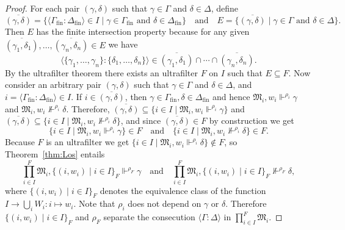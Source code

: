 \documentclass[submission,copyright,creativecommons]{eptcs}
\newcommand{\mo}{\mathfrak}
\newcommand{\finset}{_\mathrm{fin}}
\newcommand{\consec}[2]{\langle #1:#2 \rangle}
\newcommand{\satisfySym}{\Vdash}
\newcommand{\satisfy}[4]{#1, #2 \satisfySym^{#4} #3}
\newcommand{\notsatisfy}[4]{#1, #2 \not\Vdash^{#4} #3}
\begin{document}
\begin{proof}
  For each pair $(\gamma,\delta)$ such that
  $\gamma \in \Gamma$ and $\delta \in \Delta$,
  define 
  \begin{equation*}
    \overline{(\gamma,\delta)} = \{ \consec{\Gamma\finset}{\Delta\finset} \in I \mid \gamma \in \Gamma\finset \text{ and } \delta \in \Delta\finset \}
  \quad\text{and}\quad
    E = \{\overline{(\gamma,\delta)} \mid \gamma \in \Gamma \text{ and } \delta \in \Delta \}.
  \end{equation*}
  Then $E$ has the finite intersection property because for any given $\overline{(\gamma_1,\delta_1)},\ldots, \overline{(\gamma_n,\delta_n)} \in E$ we have
  \begin{equation*}
    \consec{ \{\gamma_1,\ldots,\gamma_n\}}{\{\delta_1,\ldots,\delta_n\} }  \in {\overline{(\gamma_1,\delta_1)}}\cap\cdots\cap {\overline{(\gamma_n,\delta_n)}}.
  \end{equation*}
  By the ultrafilter theorem \cite[Theorem~4.1.3]{ChaKei73} there exists an 
  ultrafilter $F$ on $I$ such that $E \subseteq F$.
%
  Now consider an arbitrary pair $(\gamma, \delta)$ such that
  $\gamma \in \Gamma$ and $\delta \in \Delta$, and $i= \consec{\Gamma\finset}{\Delta\finset} \in I$. 
  If $i \in \overline{(\gamma,\delta)}$, then $\gamma \in \Gamma\finset, \delta \in \Delta\finset$
  and hence $\satisfy{\mo{M}_i}{w_i}{\gamma}{\rho_i}$ and $\notsatisfy{\mo{M}_i}{w_i}{\delta}{\rho_i}$. Therefore,
  $\overline{(\gamma,\delta)} \subseteq \{ i \in I \mid \satisfy{\mo{M}_i}{w_i}{\gamma}{\rho_i}\}$
  and $\overline{(\gamma,\delta)} \subseteq \{ i \in I \mid \notsatisfy{\mo{M}_i}{w_i}{\delta}{\rho_i} \}$,
  and since $\overline{(\gamma, \delta)} \in F$ by construction we get
  \begin{equation*}
    \{ i \in I \mid \satisfy{\mo{M}_i}{w_i}{\gamma}{\rho_i}\} \in F
    \quad\text{and}\quad
    \{ i \in I \mid \notsatisfy{\mo{M}_i}{w_i}{\delta}{\rho_i}\} \in F.
  \end{equation*}
  Because $F$ is an ultrafilter we get
  $\{ i \in I \mid \satisfy{\mo{M}_i}{w_i}{\delta}{\rho_i}\} \not\in F$,
  so Theorem~\ref{thm:Los} entails
  \begin{equation*}
    \satisfy{\prod_{i \in I}^F\mo{M}_i}{\{(i,w_i) \mid i \in I \}_F}{\gamma}{\rho_F}
    \quad\text{and}\quad
    \notsatisfy{\prod_{i \in I}^F\mo{M}_i}{\{(i,w_i) \mid i \in I \}_F}{\delta}{\rho_F},
  \end{equation*}
  where $\{ (i, w_i) \mid i \in I \}_F$ denotes the equivalence class
  of the function $I \to \bigcup_i W_i : i \mapsto w_i$.
  Note that $\rho_i$ does not depend on $\gamma$ or $\delta$.
  Therefore $\{(i,w_i) \mid i \in I \}_F$ and $\rho_F$ separate the consecution
  $\consec{\Gamma}{\Delta}$ in $\prod_{i \in I}^F\mo{M}_i$.
\end{proof}
\end{document}
